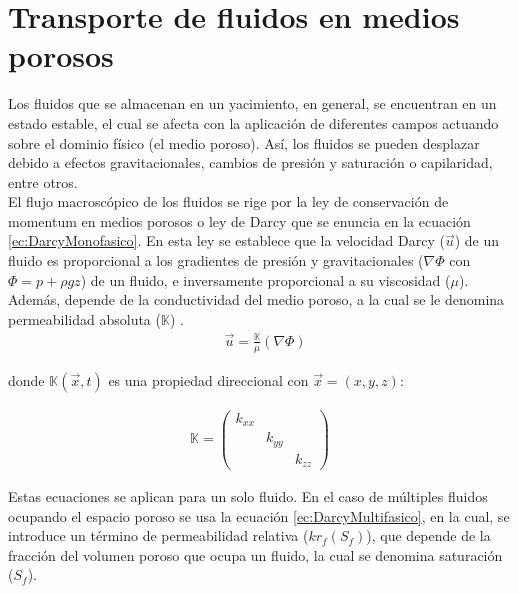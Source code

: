 \section{Transporte de fluidos en medios porosos}

Los fluidos que se almacenan en un yacimiento, en general, se encuentran en un estado estable, el cual se afecta con la aplicación de diferentes campos actuando sobre el dominio físico (el medio poroso). Así, los fluidos se pueden desplazar debido a efectos gravitacionales, cambios de presión y saturación o capilaridad, entre otros.\\ %

El flujo macroscópico de los fluidos se rige por la ley de conservación de momentum en medios porosos o ley de Darcy que se enuncia en la ecuación \ref{ec:DarcyMonofasico}. En esta ley se establece que la velocidad Darcy ($\vec{u}$) de un fluido es proporcional a los gradientes de presión y gravitacionales ($\nabla{\Phi}$ con $\Phi = p + \rho g z$) de un fluido, e inversamente proporcional a su viscosidad ($\mu$). Además, depende de la conductividad del medio poroso, a la cual se le denomina permeabilidad absoluta ($\mathbb{K}$) \citep{Whitaker1986, FANCHI2002108}.
\begin{align}
	\label{ec:DarcyMonofasico} & \vec{u}=\frac{\mathbb{K}}{\mu } \left(\nabla{\Phi}\right)	
\end{align}


donde $\mathbb{K}(\vec{x},t)$ es una propiedad direccional con $\vec{x}=(x,y,z)$:
 
\begin{align}
	\mathbb{K} = \left(\begin{array}{ccc}k_{xx}& & \\
	& k_{yy} & \\
	& & k_{zz}
	\end{array}\right)
\end{align}

Estas ecuaciones se aplican para un solo fluido. En el caso de múltiples fluidos ocupando el espacio poroso se usa la ecuación \ref{ec:DarcyMultifasico}, en la cual, se introduce un término de permeabilidad relativa ($kr_{f}(S_{f})$), que depende de la fracción del volumen poroso que ocupa un fluido, la cual se denomina saturación ($S_{f}$).

